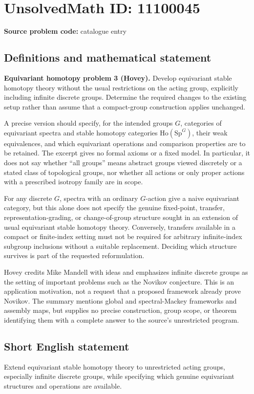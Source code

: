 \documentclass[11pt]{article}
\begin{document}
\section*{UnsolvedMath ID: 11100045}
\textbf{Source problem code:} catalogue entry
\subsection{Definitions and mathematical statement}
\textbf{Equivariant homotopy problem 3 (Hovey).} Develop equivariant stable homotopy theory without the usual restrictions on the acting group, explicitly including infinite discrete groups. Determine the required changes to the existing setup rather than assume that a compact-group construction applies unchanged.

A precise version should specify, for the intended groups $G$, categories of equivariant spectra and stable homotopy categories $\mathrm{Ho}(\mathrm{Sp}^G)$, their weak equivalences, and which equivariant operations and comparison properties are to be retained. The excerpt gives no formal axioms or a fixed model. In particular, it does not say whether ``all groups'' means abstract groups viewed discretely or a stated class of topological groups, nor whether all actions or only proper actions with a prescribed isotropy family are in scope.

For any discrete $G$, spectra with an ordinary $G$-action give a naive equivariant category, but this alone does not specify the genuine fixed-point, transfer, representation-grading, or change-of-group structure sought in an extension of usual equivariant stable homotopy theory. Conversely, transfers available in a compact or finite-index setting must not be required for arbitrary infinite-index subgroup inclusions without a suitable replacement. Deciding which structure survives is part of the requested reformulation.

Hovey credits Mike Mandell with ideas and emphasizes infinite discrete groups as the setting of important problems such as the Novikov conjecture. This is an application motivation, not a request that a proposed framework already prove Novikov. The summary mentions global and spectral-Mackey frameworks and assembly maps, but supplies no precise construction, group scope, or theorem identifying them with a complete answer to the source's unrestricted program.
\subsection{Short English statement}
Extend equivariant stable homotopy theory to unrestricted acting groups, especially infinite discrete groups, while specifying which genuine equivariant structures and operations are available.
\end{document}
